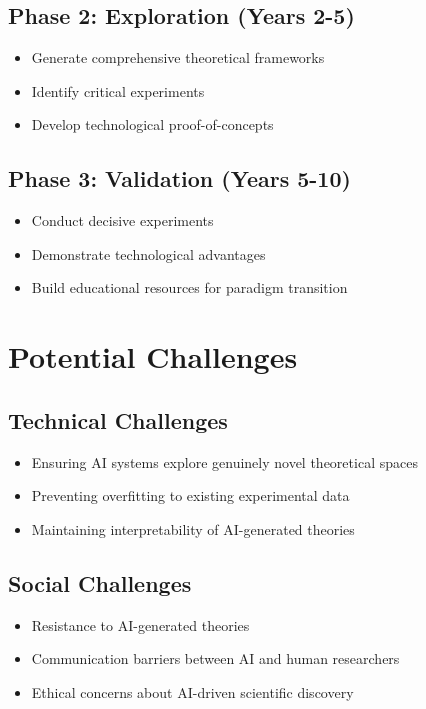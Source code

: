 \documentclass[12pt,preprint]{article}
\begin{document}
\subsection{Phase 2: Exploration (Years 2-5)}
\begin{itemize}
\item Generate comprehensive theoretical frameworks
\item Identify critical experiments
\item Develop technological proof-of-concepts
\end{itemize}

\subsection{Phase 3: Validation (Years 5-10)}
\begin{itemize}
\item Conduct decisive experiments
\item Demonstrate technological advantages
\item Build educational resources for paradigm transition
\end{itemize}

\section{Potential Challenges}

\subsection{Technical Challenges}
\begin{itemize}
\item Ensuring AI systems explore genuinely novel theoretical spaces
\item Preventing overfitting to existing experimental data
\item Maintaining interpretability of AI-generated theories
\end{itemize}

\subsection{Social Challenges}
\begin{itemize}
\item Resistance to AI-generated theories
\item Communication barriers between AI and human researchers
\item Ethical concerns about AI-driven scientific discovery
\end{itemize}
\end{document}
